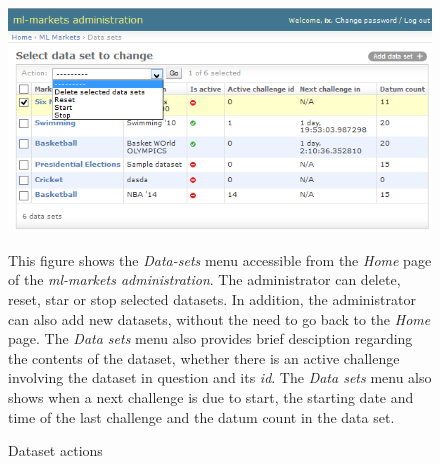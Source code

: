 \documentclass[bsc,frontabs,twoside,singlespacing,parskip,deptreport]{infthesis}     %
\begin{document}
\begin{figure}

\caption{Dataset actions}
\includegraphics[width=\textwidth]{figures/admin-dataset-actions(c).png}

\label{fig:dataset-actions}
{This figure shows the {\it Data-sets} menu accessible from the {\it Home} page of the {\it ml-markets administration}. The administrator can delete, reset, star or stop selected datasets. In addition, the administrator can also add new datasets, without the need to go back to the  {\it Home} page. The {\it Data sets} menu also provides brief desciption regarding the contents of the dataset, whether there is an active challenge involving the dataset in question and its {\it id}. The {\it Data sets} menu also shows when a next challenge is due to start, the starting date and time of the last challenge and the datum count in the data set.} 
\end{figure}
\end{document}
